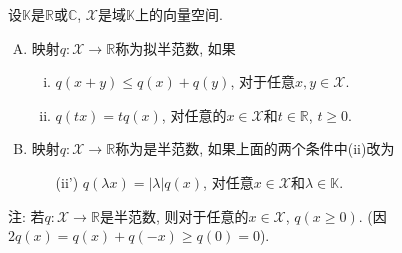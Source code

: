 设$\mathbb{K}$是$\mathbb{R}$或$\mathbb{C}$, $\mathcal{X}$是域$\mathbb{K}$上的向量空间.
\begin{enumerate}[A.]
 \item 映射$q: \mathcal{X}\to\mathbb{R}$称为拟半范数, 如果
 \begin{enumerate}[(i)]
  \item $q(x+y)\le q(x)+q(y)$, 对于任意$x,y\in\mathcal{X}$.
  \item $q(tx)=tq(x)$, 对任意的$x\in\mathcal{X}$和$t\in\mathbb{R}$, $t\ge0$.
 \end{enumerate}
  \item 映射$q:\mathcal{X}\to\mathbb{R}$称为是半范数, 如果上面的两个条件中(ii)改为
  \begin{itemize}
   \item[(ii')] $q(\lambda x)=|\lambda|q(x)$, 对任意$x\in\mathcal{X}$和$\lambda\in\mathbb{K}$.
  \end{itemize}
\end{enumerate}
注: 若$q:\mathcal{X}\to\mathbb{R}$是半范数, 则对于任意的$x\in\mathcal{X}$, $q(x\ge0)$. 
(因$2q(x)=q(x)+q(-x)\ge q(0)=0$).
\ed

